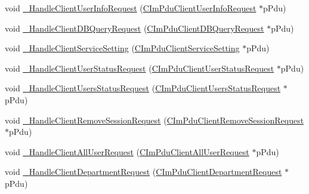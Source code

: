 \begin{DoxyCompactItemize}
\item 
void \hyperlink{class_c_msg_conn_a0a2e480d68e50c29ef2faf9dad4dc78d}{\+\_\+\+Handle\+Client\+User\+Info\+Request} (\hyperlink{class_c_im_pdu_client_user_info_request}{C\+Im\+Pdu\+Client\+User\+Info\+Request} $\ast$p\+Pdu)
\item 
void \hyperlink{class_c_msg_conn_a89c4ffc54cf8a2f5c2aa86257ecd6bd7}{\+\_\+\+Handle\+Client\+D\+B\+Query\+Request} (\hyperlink{class_c_im_pdu_client_d_b_query_request}{C\+Im\+Pdu\+Client\+D\+B\+Query\+Request} $\ast$p\+Pdu)
\item 
void \hyperlink{class_c_msg_conn_a91b807f7a703cddd142ac6ac173cf697}{\+\_\+\+Handle\+Client\+Service\+Setting} (\hyperlink{class_c_im_pdu_client_service_setting}{C\+Im\+Pdu\+Client\+Service\+Setting} $\ast$p\+Pdu)
\item 
void \hyperlink{class_c_msg_conn_a8f66b6f1b0f8f3fb7bcf1c1d5dd38b49}{\+\_\+\+Handle\+Client\+User\+Status\+Request} (\hyperlink{class_c_im_pdu_client_user_status_request}{C\+Im\+Pdu\+Client\+User\+Status\+Request} $\ast$p\+Pdu)
\item 
void \hyperlink{class_c_msg_conn_aca87183e014c732375545522c10fb46c}{\+\_\+\+Handle\+Client\+Users\+Status\+Request} (\hyperlink{class_c_im_pdu_client_users_status_request}{C\+Im\+Pdu\+Client\+Users\+Status\+Request} $\ast$p\+Pdu)
\item 
void \hyperlink{class_c_msg_conn_afaadb5a77d57b0eb2082cdf4a09f761f}{\+\_\+\+Handle\+Client\+Remove\+Session\+Request} (\hyperlink{class_c_im_pdu_client_remove_session_request}{C\+Im\+Pdu\+Client\+Remove\+Session\+Request} $\ast$p\+Pdu)
\item 
void \hyperlink{class_c_msg_conn_a370861c12ddae1b324d8a4689f030198}{\+\_\+\+Handle\+Client\+All\+User\+Request} (\hyperlink{class_c_im_pdu_client_all_user_request}{C\+Im\+Pdu\+Client\+All\+User\+Request} $\ast$p\+Pdu)
\item 
void \hyperlink{class_c_msg_conn_a68ef4d78c7fe2365965699aec9eff72f}{\+\_\+\+Handle\+Client\+Department\+Request} (\hyperlink{class_c_im_pdu_client_department_request}{C\+Im\+Pdu\+Client\+Department\+Request} $\ast$p\+Pdu)
\end{DoxyCompactItemize}
